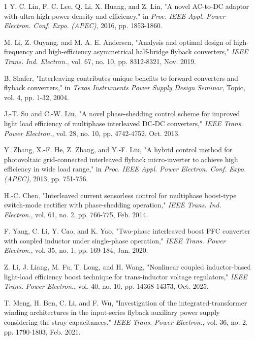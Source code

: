 \documentclass[lettersize,journal]{IEEEtran}
\begin{document}
\begin{thebibliography}{1}
Y. C. Lin, F. C. Lee, Q. Li, X. Huang, and Z. Lin, "A novel AC-to-DC adaptor with ultra-high power density and efficiency," in \textit{Proc. IEEE Appl. Power Electron. Conf. Expo. (APEC)}, 2016, pp. 1853-1860.

M. Li, Z. Ouyang, and M. A. E. Andersen, "Analysis and optimal design of high-frequency and high-efficiency asymmetrical half-bridge flyback converters," \textit{IEEE Trans. Ind. Electron.}, vol. 67, no. 10, pp. 8312-8321, Nov. 2019.

B. Shafer, "Interleaving contributes unique benefits to forward converters and flyback converters," in \textit{Texas Instruments Power Supply Design Seminar}, Topic, vol. 4, pp. 1-32, 2004.

J.-T. Su and C.-W. Liu, "A novel phase-shedding control scheme for improved light load efficiency of multiphase interleaved DC-DC converters," \textit{IEEE Trans. Power Electron.}, vol. 28, no. 10, pp. 4742-4752, Oct. 2013.

Y. Zhang, X.-F. He, Z. Zhang, and Y.-F. Liu, "A hybrid control method for photovoltaic grid-connected interleaved flyback micro-inverter to achieve high efficiency in wide load range," in \textit{Proc. IEEE Appl. Power Electron. Conf. Expo. (APEC)}, 2013, pp. 751-756.

H.-C. Chen, "Interleaved current sensorless control for multiphase boost-type switch-mode rectifier with phase-shedding operation," \textit{IEEE Trans. Ind. Electron.}, vol. 61, no. 2, pp. 766-775, Feb. 2014.

F. Yang, C. Li, Y. Cao, and K. Yao, "Two-phase interleaved boost PFC converter with coupled inductor under single-phase operation," \textit{IEEE Trans. Power Electron.}, vol. 35, no. 1, pp. 169-184, Jan. 2020.

Z. Li, J. Liang, M. Fu, T. Long, and H. Wang, "Nonlinear coupled inductor-based light-load efficiency boost technique for trans-inductor voltage regulators," \textit{IEEE Trans. Power Electron.}, vol. 40, no. 10, pp. 14368-14373, Oct. 2025.

{\color{red}
T. Meng, H. Ben, C. Li, and F. Wu, "Investigation of the integrated-transformer winding architectures in the input-series flyback auxiliary power supply considering the stray capacitances," \textit{IEEE Trans. Power Electron.}, vol. 36, no. 2, pp. 1790-1803, Feb. 2021.}


\end{thebibliography}
\end{document}
